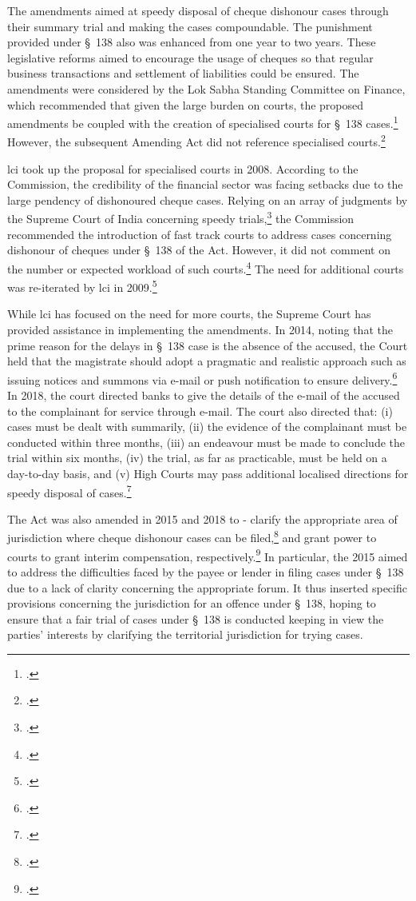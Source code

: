 \documentclass[12pt,a4paper]{article}
\begin{document}
The amendments aimed at speedy disposal of cheque dishonour cases through their summary trial and making the cases compoundable. The punishment provided under \S~138 also was enhanced from one year to two years. These legislative
reforms aimed to encourage the usage of cheques so that regular business transactions and settlement of liabilities could be ensured. The amendments were considered by the Lok Sabha Standing Committee on Finance, which recommended that given the large burden on courts, the proposed amendments be coupled with the creation of specialised courts for \S~138 cases.\footcite{stdcomm2001_138niAct} However, the subsequent Amending Act did not reference specialised courts.\footcite{niAmend2002} 

\gls{lci} took up the proposal for specialised courts in 2008. According to the Commission, the credibility of the financial sector was facing setbacks due to the large pendency of dishonoured cheque cases. Relying on an array of judgments by the Supreme Court of India concerning speedy trials,\footcite{sc1978_khatoon, sc1981_champalal, sc2005_surinder, sc2008_krishna} the Commission recommended the introduction of fast track courts to address cases concerning dishonour of cheques under \S~138 of the Act. However, it did not comment on the number or expected workload of such courts.\footcite{lci2008_138} The need for additional courts was re-iterated by \gls{lci} in 2009.\footcite{lci2009_reforms}

While \gls{lci} has focused on the need for more courts, the Supreme Court has provided assistance in implementing the amendments. In 2014, noting that the prime reason for the delays in \S~138 case is the absence of the accused, the Court held that the magistrate should adopt a pragmatic and realistic approach such as issuing notices and summons via e-mail or push notification to ensure delivery.\footcite{sc2014_iba} In 2018, the court directed banks to give the details of the e-mail of the accused to the complainant for service through e-mail. The court also directed that: (i) cases must be dealt with summarily, (ii) the evidence of the complainant must be conducted within three months, (iii) an endeavour must be made to conclude the trial within six months, (iv) the trial, as far as practicable, must be held on a day-to-day basis, and (v) High Courts may pass additional localised directions for speedy disposal of cases.\footcite{sc2018_meters}

The Act was also amended in 2015 and 2018 to - clarify the appropriate area of jurisdiction where cheque dishonour cases can be filed,\footcite{niAmend2015} and grant power to courts to grant interim compensation, respectively.\footcite{niAmend2018} In particular, the  2015 aimed to address the difficulties faced by the payee or lender in filing cases under \S~138 due to a lack of clarity concerning the appropriate forum. It thus inserted specific provisions concerning the jurisdiction for an offence under \S~138, hoping to ensure that a fair trial of cases under \S~138 is conducted keeping in view the parties' interests by clarifying the territorial jurisdiction for trying cases.
\end{document}
